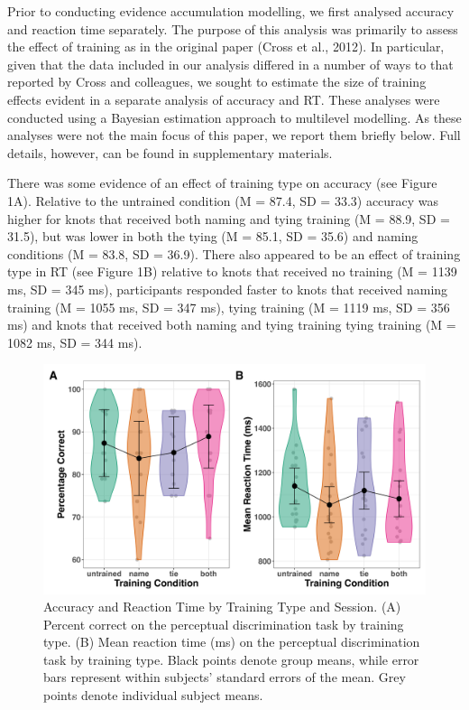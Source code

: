\documentclass[
  man, donotrepeattitle,floatsintext]{apa6}
\begin{document}
Prior to conducting evidence accumulation modelling, we first analysed accuracy and reaction time separately. The purpose of this analysis was primarily to assess the effect of training as in the original paper (Cross et al., 2012). In particular, given that the data included in our analysis differed in a number of ways to that reported by Cross and colleagues, we sought to estimate the size of training effects evident in a separate analysis of accuracy and RT. These analyses were conducted using a Bayesian estimation approach to multilevel modelling. As these analyses were not the main focus of this paper, we report them briefly below. Full details, however, can be found in supplementary materials.

There was some evidence of an effect of training type on accuracy (see Figure 1A). Relative to the untrained condition (M = 87.4, SD = 33.3) accuracy was higher for knots that received both naming and tying training (M = 88.9, SD = 31.5), but was lower in both the tying (M = 85.1, SD = 35.6) and naming conditions (M = 83.8, SD = 36.9). There also appeared to be an effect of training type in RT (see Figure 1B) relative to knots that received no training (M = 1139 ms, SD = 345 ms), participants responded faster to knots that received naming training (M = 1055 ms, SD = 347 ms), tying training (M = 1119 ms, SD = 356 ms) and knots that received both naming and tying training tying training (M = 1082 ms, SD = 344 ms).



\begin{figure}[H]

{\centering \includegraphics[height=0.67\textheight,]{../figures/descriptive/violin_acc_rt} 

}

\caption{Accuracy and Reaction Time by Training Type and Session. (A) Percent correct on the perceptual discrimination task by training type. (B) Mean reaction time (ms) on the perceptual discrimination task by training type. Black points denote group means, while error bars represent within subjects' standard errors of the mean. Grey points denote individual subject means.}\label{fig:accuracy-rt-plot}
\end{figure}
\end{document}
